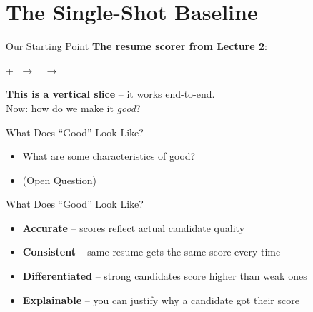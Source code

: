 \documentclass[aspectratio=169]{beamer}
\begin{document}
\section{The Single-Shot Baseline}

\begin{frame}{Our Starting Point}
\textbf{The resume scorer from Lecture 2}:
\vspace{0.3cm}

\begin{center}
 + 
$\;\longrightarrow\;$
$\;\longrightarrow\;$
\end{center}
\vspace{0.3cm}

\textbf{This is a vertical slice} -- it works end-to-end.\\
Now: how do we make it \textit{good}?
\end{frame}

\begin{frame}{What Does ``Good'' Look Like?}
\vspace{0.3cm}

\begin{itemize}
\item What are some characteristics of good? 
\item (Open Question)
\end{itemize}
\vspace{0.3cm}

\end{frame}

\begin{frame}{What Does ``Good'' Look Like?}
\vspace{0.3cm}

\begin{itemize}
\item \textbf{Accurate} -- scores reflect actual candidate quality
\item \textbf{Consistent} -- same resume gets the same score every time
\item \textbf{Differentiated} -- strong candidates score higher than weak ones
\item \textbf{Explainable} -- you can justify why a candidate got their score
\end{itemize}
\vspace{0.3cm}

\end{frame}
\end{document}

